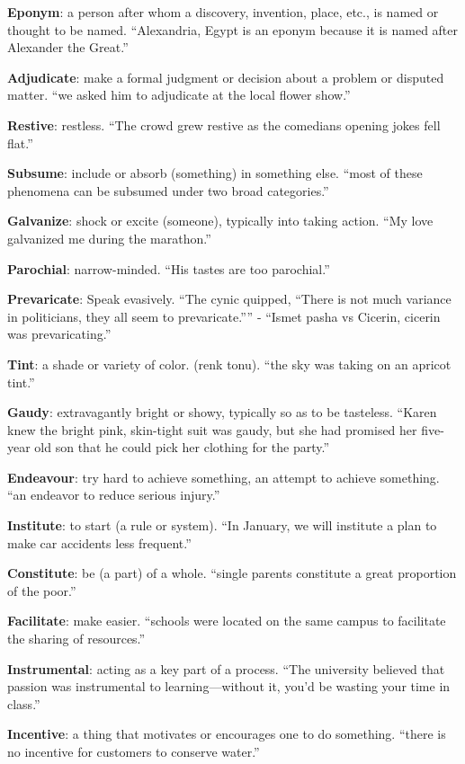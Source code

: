 \documentclass[12pt, a4paper]{ximera}
\begin{document}
\textbf{Eponym}: a person after whom a discovery, invention, place, etc., is named or thought to be named. ``Alexandria, Egypt is an eponym because it is named after Alexander the Great.''

\textbf{Adjudicate}: make a formal judgment or decision about a problem or disputed matter. ``we asked him to adjudicate at the local flower show.''

\textbf{Restive}: restless. ``The crowd grew restive as the comedians opening jokes fell flat.''

\textbf{Subsume}: include or absorb (something) in something else. ``most of these phenomena can be subsumed under two broad categories.''

\textbf{Galvanize}: shock or excite (someone), typically into taking action. ``My love galvanized me during the marathon.''

\textbf{Parochial}: narrow-minded. ``His tastes are too parochial.''

\textbf{Prevaricate}: Speak evasively. ``The cynic quipped, ``There is not much variance in politicians, they all seem to prevaricate.'''' - ``Ismet pasha vs Cicerin, cicerin was prevaricating.''

\textbf{Tint}: a shade or variety of color. (renk tonu). ``the sky was taking on an apricot tint.''

\textbf{Gaudy}: extravagantly bright or showy, typically so as to be tasteless. ``Karen knew the bright pink, skin-tight suit was gaudy, but she had promised her five-year old son that he could pick her clothing for the party.''

\textbf{Endeavour}: try hard to achieve something, an attempt to achieve something. ``an endeavor to reduce serious injury.'' 

\textbf{Institute}: to start (a rule or system). ``In January, we will institute a plan to make car accidents less frequent.''

\textbf{Constitute}: be (a part) of a whole. ``single parents constitute a great proportion of the poor.''

\textbf{Facilitate}: make easier. ``schools were located on the same campus to facilitate the sharing of resources.''

\textbf{Instrumental}: acting as a key part of a process. ``The university believed that passion was instrumental to learning—without it, you'd be wasting your time in class.''

\textbf{Incentive}: a thing that motivates or encourages one to do something. ``there is no incentive for customers to conserve water.''
\end{document}
